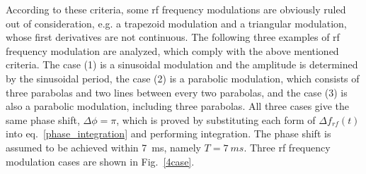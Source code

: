 According to these criteria, some rf frequency modulations are obviously ruled out of consideration, e.g. a trapezoid modulation and a triangular modulation, whose first derivatives are not continuous. The following three examples of rf frequency modulation are analyzed, which comply with the above mentioned criteria. The case (1) is a sinusoidal modulation and the amplitude is determined by the sinusoidal period, the case (2) is a parabolic modulation, which consists of three parabolas and two lines between every two parabolas, and the case (3) is also a parabolic modulation, including three parabolas. All three cases give the same phase shift, $\Delta \phi=\pi$, which is proved by substituting each form of $\Delta f_{rf}(t)$ into eq.~\ref{phase_integration} and performing integration. The phase shift is assumed to be achieved within \SI{7}{ms}, namely $T=\SI{7}{ms}$. Three rf frequency modulation cases are shown in Fig.~\ref{4case}. 

%
%
%
%

